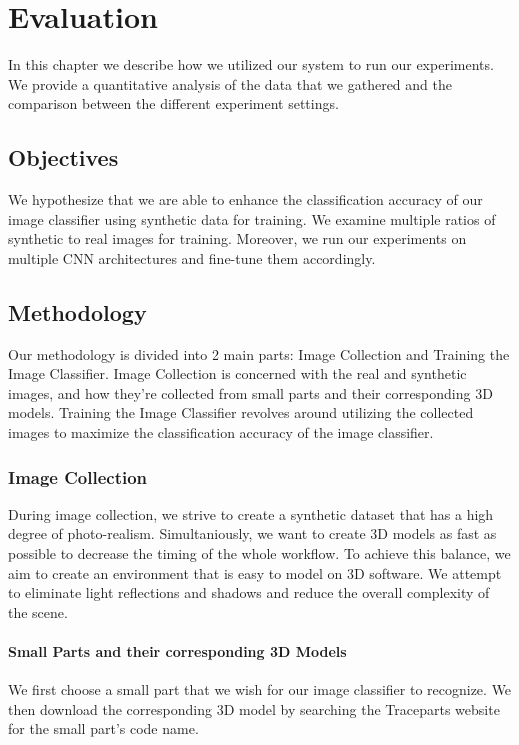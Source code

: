 \chapter{Evaluation}

In this chapter we describe how we utilized our system to run our experiments. We provide a quantitative analysis of the data that we gathered and the comparison between the different experiment settings.

\section{Objectives}

We hypothesize that we are able to enhance the classification accuracy of our image classifier using synthetic data for training. We examine multiple ratios of synthetic to real images for training. Moreover, we run our experiments on multiple CNN architectures and fine-tune them accordingly.


\section{Methodology}

Our methodology is divided into 2 main parts: Image Collection and Training the Image Classifier. Image Collection is concerned with the real and synthetic images, and how they're collected from small parts and their corresponding 3D models. Training the Image Classifier revolves around utilizing the collected images to maximize the classification accuracy of the image classifier.

\subsection{Image Collection}

During image collection, we strive to create a synthetic dataset that has a high degree of photo-realism. Simultaniously, we want to create 3D models as fast as possible to decrease the timing of the whole workflow. To achieve this balance, we aim to create an environment that is easy to model on 3D software. We attempt to eliminate light reflections and shadows and reduce the overall complexity of the scene.

\subsubsection{Small Parts and their corresponding 3D Models}
We first choose a small part that we wish for our image classifier to recognize. We then download the corresponding 3D model by searching the Traceparts website \cite{traceparts} for the small part's code name.

